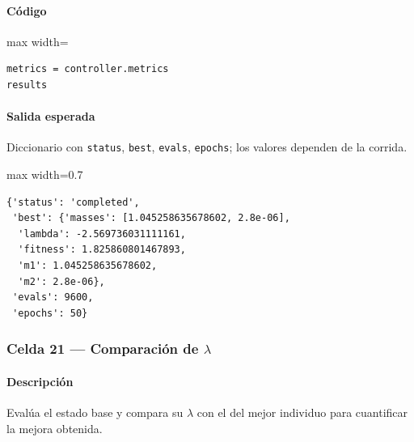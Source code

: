 \paragraph{Código}
\par\smallskip
\begin{listing}[H]
\caption{Celda 19: inspección de resultados}
\begin{adjustbox}{max width=\textwidth}
\begin{minipage}{\textwidth}
\begin{verbatim}
metrics = controller.metrics
results
\end{verbatim}
\end{minipage}
\end{adjustbox}
\end{listing}
\paragraph{Salida esperada} Diccionario con \texttt{status}, \texttt{best}, \texttt{evals}, \texttt{epochs}; los valores dependen de la corrida.

\begin{listing}[H]
\caption{Ejemplo Salida}
\begin{adjustbox}{max width=0.7\textwidth}
\begin{minipage}{\textwidth}
\begin{verbatim}
{'status': 'completed',
 'best': {'masses': [1.045258635678602, 2.8e-06],
  'lambda': -2.569736031111161,
  'fitness': 1.825860801467893,
  'm1': 1.045258635678602,
  'm2': 2.8e-06},
 'evals': 9600,
 'epochs': 50}
\end{verbatim}
\end{minipage}
\end{adjustbox}
\end{listing}

\subsubsection*{Celda 21 — Comparación de $\lambda$}
\paragraph{Descripción} Evalúa el estado base y compara su $\lambda$ con el del mejor individuo para cuantificar la mejora obtenida.
